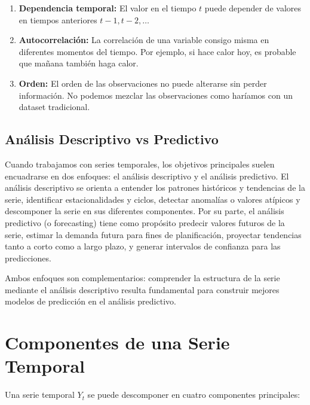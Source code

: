 \documentclass[12pt]{article}
\begin{document}
\begin{enumerate}
    \item \textbf{Dependencia temporal:} El valor en el tiempo $t$ puede depender de valores en tiempos anteriores $t-1, t-2, \ldots$

    \item \textbf{Autocorrelación:} La correlación de una variable consigo misma en diferentes momentos del tiempo. Por ejemplo, si hace calor hoy, es probable que mañana también haga calor.

    \item \textbf{Orden:} El orden de las observaciones no puede alterarse sin perder información. No podemos mezclar las observaciones como haríamos con un dataset tradicional.
\end{enumerate}

\subsection{Análisis Descriptivo vs Predictivo}

Cuando trabajamos con series temporales, los objetivos principales suelen encuadrarse en dos enfoques: el análisis descriptivo y el análisis predictivo. El análisis descriptivo se orienta a entender los patrones históricos y tendencias de la serie, identificar estacionalidades y ciclos, detectar anomalías o valores atípicos y descomponer la serie en sus diferentes componentes. Por su parte, el análisis predictivo (o forecasting) tiene como propósito predecir valores futuros de la serie, estimar la demanda futura para fines de planificación, proyectar tendencias tanto a corto como a largo plazo, y generar intervalos de confianza para las predicciones.

\vspace{0.5em}

Ambos enfoques son complementarios: comprender la estructura de la serie mediante el análisis descriptivo resulta fundamental para construir mejores modelos de predicción en el análisis predictivo.

\section{Componentes de una Serie Temporal}

Una serie temporal $Y_t$ se puede descomponer en cuatro componentes principales:
\end{document}
